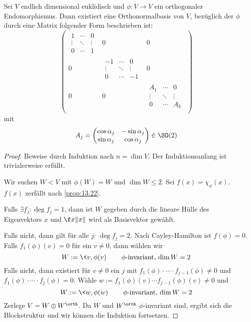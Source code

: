 \documentclass[a4paper, 10pt]{scrbook}
\begin{document}
\begin{thm}
	\label{thm:13.23}
	Sei $V$ endlich dimensional euklidisch und $\phi : V\to V$ ein orthogonaler Endomorphismus.
	Dann existiert eine Orthonormalbasis von $V$, bezüglich der $\phi$ durch eine Matrix folgender Form beschrieben ist:
	\[
		\begin{pmatrix}
			\begin{matrix}1&\cdots&0\\\vdots&\ddots&\vdots\\0&\cdots&1\end{matrix} & 
												   0&0\\
						0&	  
			\begin{matrix}-1&\cdots&0\\\vdots&\ddots&\vdots\\0&\cdots&-1\end{matrix} &
			0\\
			0&	  
   0&					
  \begin{matrix}A_1&\cdots&0\\\vdots&\ddots&\vdots\\0&\cdots&A_k\end{matrix} \\
		\end{pmatrix}
	\]
	mit
	\[
		A_j = \begin{pmatrix}\cos \alpha_j & -\sin \alpha_j \\ \sin \alpha_j & \cos \alpha_j\end{pmatrix} \in \SO(2)
	\]
	\begin{proof}
		Beweise durch Induktion nach $n=\dim V$.
		Der Induktionsanfang ist trivialerweise erfüllt.

		Wir suchen $W < V$ mit $\phi(W) = W$ und $\dim W\le 2$.  
		Sei $f(x) = \chi_\phi(x)$.
		$f(x)$ zerfällt nach \ref{prop:13.22}.

		Falls $\exists f_j: \deg f_j = 1$, dann ist $W$ gegeben durch die lineare Hülle des Eigenvektors $x$ und $\f x{\|x\|}$ wird als Basisvektor gewählt.

		Falls nicht, dann gilt für alle $j$: $\deg f_j = 2$.
		Nach Cayley-Hamilton ist $f(\phi) = 0$.
		Falls $f_1(\phi)(v) = 0$ für ein $v\neq 0$, dann wählen wir
		\[
			W := \<v,\phi(v)\> \qquad \text{$\phi$-invariant, $\dim W =2$}
		\]
		Falls nicht, dann existiert für $v\neq 0$ ein $j$ mit $f_1(\phi)\cdot \dotsb \cdot f_{j-1}(\phi) \neq 0$ und $f_1(\phi)\cdot \dotsb \cdot f_j(\phi) = 0$.
		Wähle $w:= f_1(\phi)(v) \dotsb f_{j-1}(\phi)(v) \neq 0$ und
		\[
			W := \<w,\phi(w)\> \qquad \text{$\phi$-invariant, $\dim W = 2$}
		\]
		Zerlege $V = W \oplus W^\orth$.
		Da $W$ und $W^\orth$ $\phi$-invariant sind, ergibt sich die Blockstruktur und wir können die Induktion fortsetzen.

	\end{proof}
\end{thm}
\end{document}

